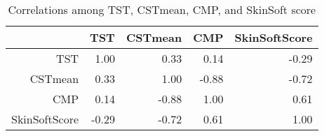 \begin{table}[ht]
\centering
\caption{Correlations among TST, CSTmean, CMP, and SkinSoft score}
\label{tab:corsoft}
\begin{tabular}{rrrrr}
  \hline
 & TST & CSTmean & CMP & SkinSoftScore \\ 
  \hline
TST & 1.00 & 0.33 & 0.14 & -0.29 \\ 
  CSTmean & 0.33 & 1.00 & -0.88 & -0.72 \\ 
  CMP & 0.14 & -0.88 & 1.00 & 0.61 \\ 
  SkinSoftScore & -0.29 & -0.72 & 0.61 & 1.00 \\ 
   \hline
\end{tabular}
\end{table}

